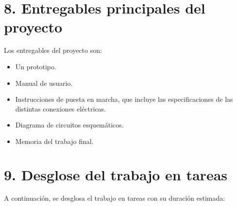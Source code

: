 \documentclass[
11pt, %
]{charter}
\begin{document}
\section{8. Entregables principales del proyecto}
\label{sec:entregables}


Los entregables del proyecto son:

\begin{itemize}
	\item Un prototipo.
	\item Manual de usuario.
	\item Instrucciones de puesta en marcha, que incluye las especificaciones de las distintas conexiones eléctricas.
	\item Diagrama de circuitos esquemáticos.
	\item Memoria del trabajo final.
\end{itemize}


\section{9. Desglose del trabajo en tareas}
\label{sec:wbs}

A continuación, se desglosa el trabajo en tareas con su duración estimada:
\end{document}
